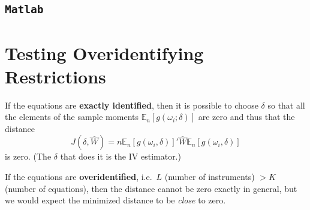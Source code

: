 \documentclass[12pt,]{book}
\newenvironment{Shaded}{\begin{snugshade}}{\end{snugshade}}
\newcommand{\CommentTok}[1]{\textcolor[rgb]{0.56,0.35,0.01}{\textit{#1}}}
\newcommand{\FloatTok}[1]{\textcolor[rgb]{0.00,0.00,0.81}{#1}}
\newcommand{\NormalTok}[1]{#1}
\begin{document}
\hypertarget{matlab-7}{%
\subsection{\texorpdfstring{\texttt{Matlab}}{Matlab}}\label{matlab-7}}

\begin{Shaded}
\end{Shaded}

\hypertarget{testing-overidentifying-restrictions}{%
\section{Testing Overidentifying Restrictions}\label{testing-overidentifying-restrictions}}

If the equations are \textbf{exactly identified}, then it is possible to choose \(\delta\) so that all the elements of the sample moments \(\mathbb E_n[g(\omega_i; \delta)]\) are zero and thus that the distance
\[
J(\delta, \hat{W}) = n \mathbb E_n[g(\omega_i, \delta)]' \hat{W} \mathbb E_n[g(\omega_i, \delta)]
\]
is zero. (The \(\delta\) that does it is the IV estimator.)

If the equations are \textbf{overidentified}, i.e.~\(L\) (number of instruments) \(> K\) (number of equations), then the distance cannot be zero exactly in general, but we would expect the minimized distance to be \emph{close} to zero.
\end{document}
